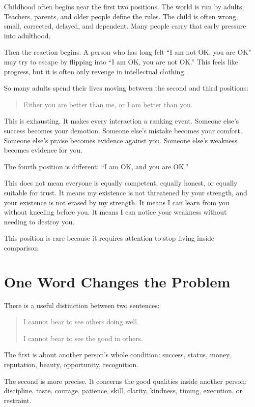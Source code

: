 Childhood often begins near the first two positions. The world is run by adults. Teachers, parents, and older people define the rules. The child is often wrong, small, corrected, delayed, and dependent. Many people carry that early pressure into adulthood.

Then the reaction begins. A person who has long felt ``I am not OK, you are OK'' may try to escape by flipping into ``I am OK, you are not OK.'' This feels like progress, but it is often only revenge in intellectual clothing.

So many adults spend their lives moving between the second and third positions:

\begin{quote}
Either you are better than me, or I am better than you.
\end{quote}

This is exhausting. It makes every interaction a ranking event. Someone else's success becomes your demotion. Someone else's mistake becomes your comfort. Someone else's praise becomes evidence against you. Someone else's weakness becomes evidence for you.

The fourth position is different: ``I am OK, and you are OK.''

This does not mean everyone is equally competent, equally honest, or equally suitable for trust. It means my existence is not threatened by your strength, and your existence is not erased by my strength. It means I can learn from you without kneeling before you. It means I can notice your weakness without needing to destroy you.

This position is rare because it requires attention to stop living inside comparison.

\section*{One Word Changes the Problem}

There is a useful distinction between two sentences:

\begin{quote}
I cannot bear to see others doing well.

I cannot bear to see the good in others.
\end{quote}

The first is about another person's whole condition: success, status, money, reputation, beauty, opportunity, recognition.

The second is more precise. It concerns the good qualities inside another person: discipline, taste, courage, patience, skill, clarity, kindness, timing, execution, or restraint.

